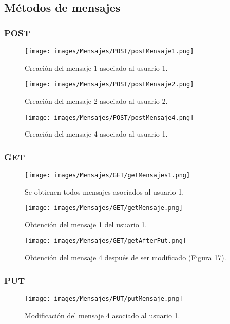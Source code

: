 \documentclass[12pt,a4paper, spanish]{article}
\begin{document}
\subsection{Métodos de mensajes}
\subsubsection{POST}
\begin{figure}[H]
	\centering
	\texttt{[image: images/Mensajes/POST/postMensaje1.png]}
	\caption{Creación del mensaje 1 asociado al usuario 1.}
\end{figure}

\begin{figure}[H]
	\centering
	\texttt{[image: images/Mensajes/POST/postMensaje2.png]}
	\caption{Creación del mensaje 2 asociado al usuario 2.}
\end{figure}

\begin{figure}[H]
	\centering
	\texttt{[image: images/Mensajes/POST/postMensaje4.png]}
	\caption{Creación del mensaje 4 asociado al usuario 1.}
\end{figure}
\newpage
\subsubsection{GET}

\begin{figure}[H]
	\centering
	\texttt{[image: images/Mensajes/GET/getMensajes1.png]}
	\caption{Se obtienen todos mensajes asociados al usuario 1.}
\end{figure}

\begin{figure}[H]
	\centering
	\texttt{[image: images/Mensajes/GET/getMensaje.png]}
	\caption{Obtención del mensaje 1 del usuario 1.}
\end{figure}

\begin{figure}[H]
	\centering
	\texttt{[image: images/Mensajes/GET/getAfterPut.png]}
	\caption{Obtención del mensaje 4 después de ser modificado (Figura 17).}
\end{figure}

\subsubsection{PUT}
\begin{figure}[H]
	\centering
	\texttt{[image: images/Mensajes/PUT/putMensaje.png]}
	\caption{Modificación del mensaje 4 asociado al usuario 1.}
\end{figure}
\end{document}
